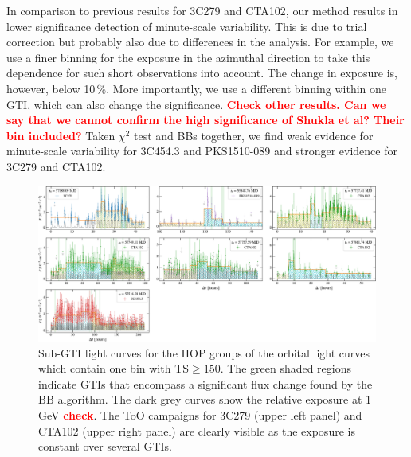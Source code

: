 \documentclass[twocolumn,linenumbers]{aastex62}
\newcommand{\todo}[1]{\textbf{\textcolor{red}{#1}}}
\begin{document}
In comparison to previous results for 3C279 and CTA102, our method results in lower significance detection of minute-scale variability. 
This is due to trial correction but probably also due to differences in the analysis. For example, we use a finer binning for the exposure in the azimuthal direction to take this dependence for such short observations into account. 
The change in exposure is, however, below 10\,\%.
More importantly, we use a different binning within one GTI, which can also change the significance. 
\todo{Check other results. Can we say that we cannot confirm the high significance of Shukla et al? Their bin included?} 
Taken $\chi^2$ test and BBs together, we find weak evidence for minute-scale variability for 3C454.3 and PKS1510-089 and stronger evidence for 3C279 and CTA102.
\begin{figure}
    \centering
    \includegraphics[width = .9\linewidth]{figures/lc_minute_3min.pdf}
    \caption{Sub-GTI light curves for the HOP groups of the orbital light curves which contain one bin with $\mathrm{TS} \geqslant 150$. The green shaded regions indicate GTIs that encompass a significant flux change found by the BB algorithm. The dark grey curves show the relative exposure at 1\,GeV \todo{check}. The ToO campaigns for 3C279 (upper left panel) and CTA102 (upper right panel) are clearly visible as the exposure is constant over several GTIs. }
    \label{fig:lc_minutes}
\end{figure}
\end{document}
